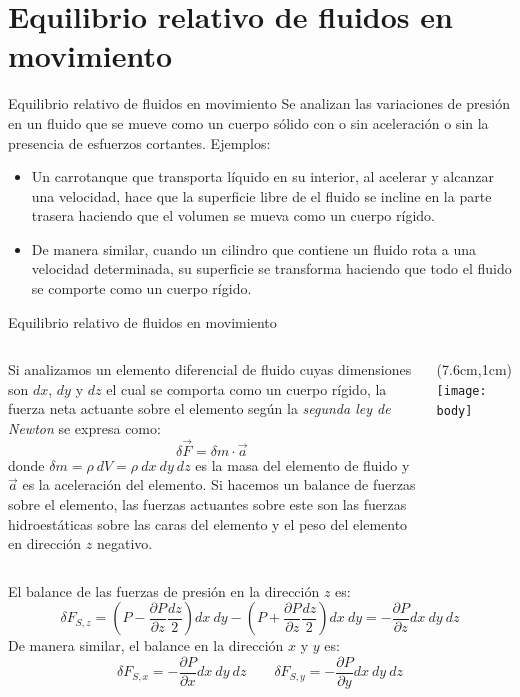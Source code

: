 \documentclass [xcolor=svgnames, t] {beamer}
\begin{document}
\section{Equilibrio relativo de fluidos en movimiento}
\begin{frame}{Equilibrio relativo de fluidos en movimiento}
Se analizan las variaciones de presi\'on en un fluido que se mueve como un cuerpo s\'olido con o sin aceleraci\'on o sin la presencia de esfuerzos cortantes. Ejemplos:
\begin{itemize}
\item Un carrotanque que transporta l\'iquido en su interior, al acelerar y alcanzar una velocidad, hace que la superficie libre de el fluido se incline en la parte trasera haciendo que el volumen se mueva como un cuerpo r\'igido. 
\item De manera similar, cuando un cilindro que contiene un fluido rota a una velocidad determinada, su superficie se transforma haciendo que todo el fluido se comporte como un cuerpo r\'igido.
\end{itemize}
\end{frame}

\begin{frame}{Equilibrio relativo de fluidos en movimiento}
\footnotesize
\vspace{-0.4cm}
\begin{columns}
Si analizamos un elemento diferencial de fluido cuyas dimensiones son $dx$, $dy$ y $dz$  el cual se comporta como un cuerpo r\'igido, la fuerza neta actuante sobre el elemento seg\'un la \emph{segunda ley de Newton} se expresa como:
$$
\delta \vec{F} = \delta m \cdot \vec{a}
$$
donde $\delta m = \rho\ dV = \rho\ dx\ dy\ dz$ es la masa del elemento de fluido y $\vec{a}$ es la aceleraci\'on del elemento. 
Si hacemos un balance de fuerzas sobre el elemento, las fuerzas actuantes sobre este son las fuerzas hidroest\'aticas sobre las caras del elemento  y el peso del elemento en direcci\'on $z$ negativo.
\begin{textblock*}{5cm}(7.6cm,1cm) %
\texttt{[image: body]}
\end{textblock*}
\end{columns}
\vspace{0.5cm}
El balance de las fuerzas de presi\'on en la direcci\'on $z$ es:
$$
\delta F_{S,z} = \left( P - \frac{\partial P}{\partial z} \frac{dz}{2} \right) dx\ dy - \left( P + \frac{\partial P}{\partial z} \frac{dz}{2} \right) dx\ dy = -\frac{\partial P}{\partial z} dx\ dy\ dz
$$
De manera similar, el balance en la direcci\'on $x$ y $y$ es:
$$
\delta F_{S,x} =  -\frac{\partial P}{\partial x} dx\ dy\ dz \quad \quad  \delta F_{S,y} =  -\frac{\partial P}{\partial y} dx\ dy\ dz
$$
\end{frame}
\end{document}
